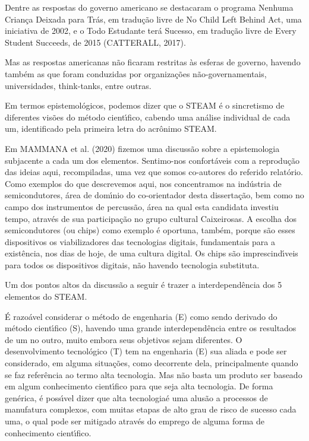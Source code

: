 \documentclass[
12pt,		%
openright,	%
twoside,  %
a4paper,			%
chapter=TITLE,		%
english,			%
french,				%
spanish,			%
brazil				%
]{USPSC-classe/USPSC}
\begin{document}
Dentre as respostas do governo americano se destacaram o programa \textquotedbl Nenhuma Crian\c{c}a Deixada para Tr\'as, em tradu\c{c}\~ao livre de \textquotedbl No Child Left Behind Act, uma iniciativa de 2002, e o \textquotedbl Todo Estudante ter\'a Sucesso, em tradu\c{c}\~ao livre de \textquotedbl Every Student Succeeds, de 2015  (CATTERALL, 2017).




Mas as respostas americanas n\~ao ficaram restritas \`as esferas de governo, havendo tamb\'em as que foram conduzidas por organiza\c{c}\~oes n\~ao-governamentais, universidades, think-tanks, entre outras.




Em termos epistemol\'ogicos, podemos dizer que o STEAM \'e o sincretismo de diferentes vis\~oes do m\'etodo cient\'{\i}fico, cabendo uma an\'alise individual de cada um, identificado pela primeira letra do acr\^onimo STEAM.




Em  MAMMANA et al. (2020) fizemos uma discuss\~ao sobre a epistemologia subjacente a cada um dos elementos. Sentimo-nos confort\'aveis com a reprodu\c{c}\~ao das ideias aqui, recompiladas, uma vez que somos co-autores do referido relat\'orio. Como exemplos do que descrevemos aqui, nos concentramos na ind\'ustria de semicondutores, \'area de dom\'{\i}nio do co-orientador desta disserta\c{c}\~ao, bem como no campo dos instrumentos de percuss\~ao, \'area na qual esta candidata investiu tempo, atrav\'es de sua participa\c{c}\~ao no grupo cultural \textquotedbl Caixeirosas\textquotedbl . A escolha dos semicondutores (ou chips) como exemplo \'e oportuna, tamb\'em, porque s\~ao esses dispositivos os viabilizadores das tecnologias digitais, fundamentais para a exist\^encia, nos dias de hoje, de uma \textquotedbl cultura digital\textquotedbl . Os chips s\~ao imprescind\'{\i}veis para todos os dispositivos digitais, n\~ao havendo tecnologia substituta.




Um dos pontos altos da discuss\~ao a seguir \'e trazer a interdepend\^encia dos 5 elementos do STEAM.




\'E razo\'avel considerar o m\'etodo de engenharia (E) como sendo derivado do m\'etodo cient\'{\i}fico (S), havendo uma grande interdepend\^encia entre os resultados de um no outro, muito embora seus objetivos sejam diferentes. O desenvolvimento tecnol\'ogico (T) tem na engenharia (E) sua aliada e pode ser considerado, em alguma situa\c{c}\~oes, como decorrente dela, principalmente quando se faz refer\^encia ao termo \textquotedbl alta tecnologia\textquotedbl . Mas n\~ao basta um produto ser baseado em algum conhecimento cient\'{\i}fico para que seja alta tecnologia. De forma gen\'erica, \'e poss\'{\i}vel dizer que \textquotedbl alta tecnologia\textquotedbl  \'e uma alus\~ao a processos de manufatura complexos, com muitas etapas de alto grau de risco de sucesso cada uma, o qual pode ser mitigado atrav\'es do emprego de alguma forma de conhecimento cient\'{\i}fico.
\end{document}
